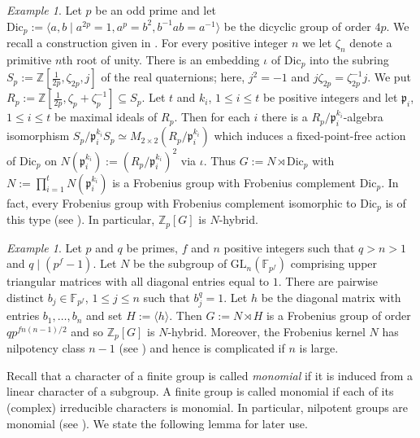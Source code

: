 \documentclass[12pt]{amsart}
\theoremstyle{plain}
\theoremstyle{remark}
\newtheorem{example}[theorem]{Example}
\theoremstyle{definition}
\numberwithin{equation}{section}
\begin{document}
\begin{example}\label{ex:dicyclic-complement}
Let $p$ be an odd prime and let ${\mathrm{Dic}}_{p} := \langle a,b \mid a^{2p}=1, a^{p}=b^{2}, b^{-1}ab = a^{-1} \rangle$ be the dicyclic group of order $4p$.
We recall a construction given in \cite[Chapter 14]{MR1828640}.
For every positive integer $n$ we let $\zeta_{n}$ denote a primitive $n$th root of unity.
There is an embedding $\iota$ of ${\mathrm{Dic}}_{p}$ into the subring $S_{p} := {\mathbb{Z}}[\frac{1}{2p}, \zeta_{2p},j]$ of the real quaternions;
here, $j^{2} = -1$ and $j \zeta_{2p} = \zeta_{2p}^{-1} j$.
We put $R_{p} := {\mathbb{Z}}[\frac{1}{2p}, \zeta_{p} + \zeta_{p}^{-1}] \subseteq S_{p}$.
Let $t$ and $k_{i}$, $1\leq i \leq t$ be positive integers and let $\mathfrak{p}_{i}$, $1 \leq i \leq t$ be maximal ideals of $R_{p}$.
Then for each $i$ there is a $R_{p} / \mathfrak{p}_{i}^{k_{i}}$-algebra isomorphism
$S_{p} / \mathfrak{p}_{i}^{k_{i}} S_{p} \simeq M_{2 \times 2} (R_{p}/\mathfrak{p}_{i}^{k_{i}})$ which
induces a fixed-point-free action of ${\mathrm{Dic}}_{p}$ on $N(\mathfrak{p}_{i}^{k_{i}}) := (R_{p} / \mathfrak{p}_{i}^{k_{i}})^{2}$ via $\iota$.
Thus $G := N \rtimes {\mathrm{Dic}}_{p}$ with $N := \prod_{i=1}^{t} N(\mathfrak{p}_{i}^{k_{i}})$ is a Frobenius group with Frobenius complement ${\mathrm{Dic}}_{p}$.
In fact, every Frobenius group with Frobenius complement isomorphic to ${\mathrm{Dic}}_{p}$
is of this type (see \cite[Theorem 14.4]{MR1828640}).
In particular, ${\mathbb{Z}}_{p}[G]$ is $N$-hybrid.
\end{example}

\begin{example} \label{ex:non-abelian-kernel}
Let $p$ and $q$ be primes, $f$ and $n$ positive integers such that $q>n>1$ and $q \mid (p^{f}-1)$.
Let $N$ be the subgroup of ${\mathrm{GL}}_{n}({\mathbb{F}}_{p^{f}})$ comprising upper triangular matrices with all diagonal
entries equal to $1$.
There are pairwise distinct $b_{j} \in {\mathbb{F}}_{p^{f}}$, $1 \leq j \leq n$ such that $b_{j}^{q} = 1$.
Let $h$ be the diagonal matrix with entries $b_{1}, \dots, b_{n}$ and set $H:= \langle h \rangle$.
Then $G := N \rtimes H$ is a Frobenius group  of order $q p^{fn(n-1)/2}$ and so ${\mathbb{Z}}_{p}[G]$ is $N$-hybrid.
Moreover, the Frobenius kernel $N$ has nilpotency class $n-1$ (see \cite[Example 16.8b]{MR1645304})
and hence is complicated if $n$ is large.
\end{example}

Recall that a character of a finite group is called \emph{monomial} if it
is induced from a linear character of a subgroup.
A finite group is called monomial if each of its (complex) irreducible characters is monomial.
In particular, nilpotent groups are monomial (see \cite[Theorem 11.3]{MR632548}).
We state the following lemma for later use.
\end{document}
